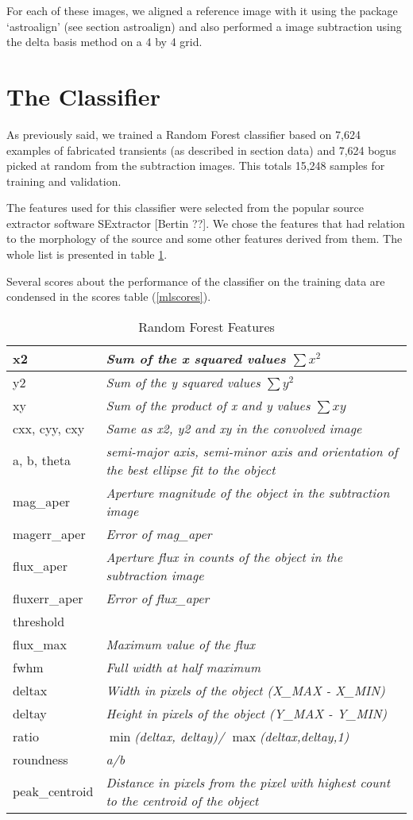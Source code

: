 For each of these images, we aligned a reference image with it using the package `astroalign' (see section astroalign) and also performed a image subtraction using the delta basis method on a 4 by 4 grid.

\section{The Classifier}

As previously said, we trained a Random Forest classifier based on 7,624 examples of fabricated transients (as described in section data) and 7,624 bogus picked at random from the subtraction images. This totals 15,248 samples for training and validation.

The features used for this classifier were selected from the popular source extractor software SExtractor [Bertin ??]. We chose the features that had relation to the morphology of the source and some other features derived from them.
The whole list is presented in table \ref{mlfeatures}.

Several scores about the performance of the classifier on the training data are condensed in the scores table (\ref{mlscores}).

\begin{table}
\centering
\begin{tabular}{|l| >{\itshape}l|}
  \hline
  x2 & Sum of the x squared values $\sum x^2 $ \\ \hline
  y2 & Sum of the y squared values $\sum y^2 $\\ \hline
  xy & Sum of the product of x and y values $\sum xy $\\ \hline
  cxx, cyy, cxy & Same as x2, y2 and xy in the convolved image  \\ \hline
  a, b, theta & semi-major axis, semi-minor axis and orientation of the best ellipse fit to the object \\ \hline
  mag\_aper & Aperture magnitude of the object in the subtraction image \\ \hline     magerr\_aper & Error of mag\_aper \\ \hline
  flux\_aper & Aperture flux in counts of the object in the subtraction image \\ \hline
  fluxerr\_aper & Error of flux\_aper \\ \hline
threshold & \\ \hline
flux\_max & Maximum value of the flux \\ \hline
fwhm & Full width at half maximum \\ \hline
deltax & Width in pixels of the object (X\_MAX - X\_MIN) \\ \hline
deltay & Height in pixels of the object (Y\_MAX - Y\_MIN) \\ \hline
ratio & $\min$(deltax, deltay)/ $\max$(deltax,deltay,1) \\ \hline
roundness & a/b\\ \hline
peak\_centroid & Distance in pixels from the pixel with highest count to the centroid of the object \\ \hline
\end{tabular}
\caption{Random Forest Features}
\label{mlfeatures}
\end{table}

